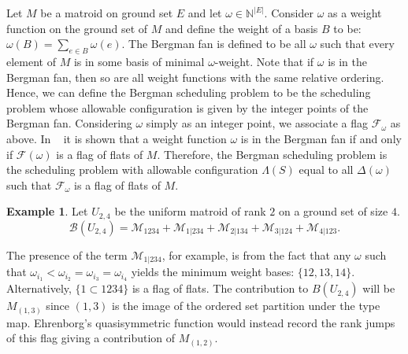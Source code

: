 \documentclass[12pt,reqno]{amsart}
\numberwithin{definition}{section}
\theoremstyle{definition}
\newtheorem{example}[definition]{Example}
\newcommand{\om}{\omega}
\newcommand{\ncM}{\mathcal{M}}
\newcommand{\allow}{\Lambda} %
\begin{document}
Let $M$ be a matroid on ground set $E$ and let $\omega \in
\mathbb{N}^{|E|}$.  Consider $\omega$ as a weight function on the ground
set of $M$ and define the weight of a basis $B$ to be: $\omega(B) =
\sum_{e\in B} \omega(e)$.  The Bergman fan is defined to be  all
$\omega$ such that every element of $M$ is in some basis of minimal $\omega$-weight.  Note that if $\omega$ is in the Bergman fan, then so are all
weight functions with the same relative ordering.  Hence, we can
define the Bergman scheduling problem to be the scheduling problem
whose allowable configuration is given by the integer points of the
Bergman fan.
  Considering $\omega$ simply as an integer
  point, we associate a flag $\mathcal{F}_{\omega}$ as above.
In ~\cite{AK} it is shown that a weight function $\omega$ is  in the Bergman fan
if and only if $\mathcal{F}(\om)$ is a flag of flats of $M$.
Therefore, the Bergman scheduling problem is the scheduling problem with allowable configuration $\allow(S)$ equal to all $\Delta(\om)$ such that $\mathcal{F}_{\omega}$ is a flag of flats of $M$. 


\begin{example}

Let $U_{2,4}$ be the uniform matroid of rank $2$ on a ground set of
size $4$.  
$$\mathcal{B}(U_{2,4})  = {\ncM}_{1234} + {\ncM}_{1|234} + {\ncM}_{2|134} + {\ncM}_{3|124} + {\ncM}_{4|123}. $$

The presence of the term ${\ncM}_{1|234}$, for example, is from the
fact that any $\omega$ such that $\omega_{i_1} < \omega_{i_2} =
\omega_{i_3} = \omega_{i_4}$ yields the minimum weight bases:
$\{12,13,14\}$.  Alternatively, $\{ 1 \subset 1234\}$ is a flag of
flats.  The contribution to $B(U_{2,4})$ will be $M_{(1,3)}$ since $(1,3)$
is the image of the ordered set partition under the type map.
Ehrenborg's quasisymmetric function would instead record the rank jumps of this flag giving a contribution of $M_{(1,2)}$.


\end{example}
\end{document}
